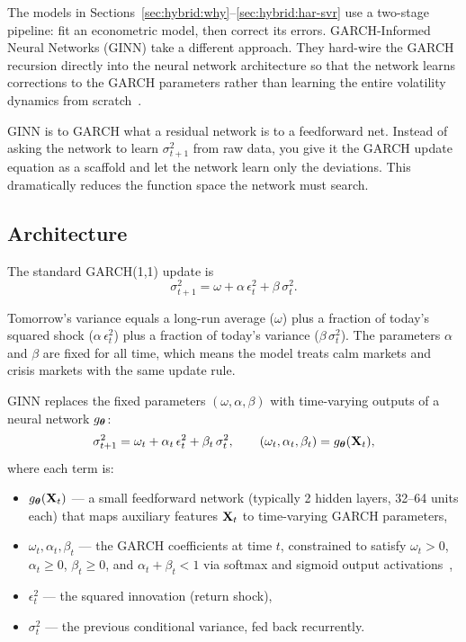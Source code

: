 The models in Sections~\ref{sec:hybrid:why}--\ref{sec:hybrid:har-svr} use
a two-stage pipeline: fit an econometric model, then correct its errors.
GARCH-Informed Neural Networks (GINN) take a different approach.
They hard-wire the GARCH recursion directly into the neural network
architecture so that the network learns corrections to the GARCH
parameters rather than learning the entire volatility dynamics from
scratch~\citep{GINN2024}.

\begin{keyidea}[GINN = Residual Learning for GARCH]
GINN is to GARCH what a residual network is to a feedforward net.
Instead of asking the network to learn $\sigma^2_{t+1}$ from raw data,
you give it the GARCH update equation as a scaffold and let the network
learn only the deviations.  This dramatically reduces the function space
the network must search.
\end{keyidea}

\subsection{Architecture}

The standard GARCH(1,1) update is
\begin{equation}\label{eq:garch-update}
  \sigma^2_{t+1} = \omega + \alpha\,\epsilon_t^2 + \beta\,\sigma^2_t.
\end{equation}

\begin{intuition}
Tomorrow's variance equals a long-run average ($\omega$) plus a fraction
of today's squared shock ($\alpha\,\epsilon_t^2$) plus a fraction of
today's variance ($\beta\,\sigma^2_t$).  The parameters $\alpha$ and
$\beta$ are fixed for all time, which means the model treats calm
markets and crisis markets with the same update rule.
\end{intuition}

GINN replaces the fixed parameters $(\omega, \alpha, \beta)$ with
time-varying outputs of a neural network $g_{\bm{\theta}}$:
\begin{equation}\label{eq:ginn}
  \sigma^2_{t+1} = \omega_t + \alpha_t\,\epsilon_t^2
    + \beta_t\,\sigma^2_t,
  \qquad
  (\omega_t, \alpha_t, \beta_t) = g_{\bm{\theta}}(\mathbf{X}_t),
\end{equation}
where each term is:
\begin{itemize}
  \item $g_{\bm{\theta}}(\mathbf{X}_t)$ --- a small feedforward network (typically 2
        hidden layers, 32--64 units each) that maps auxiliary features
        $\mathbf{X}_t$ to time-varying GARCH parameters,
  \item $\omega_t, \alpha_t, \beta_t$ --- the GARCH coefficients at time
        $t$, constrained to satisfy $\omega_t > 0$, $\alpha_t \geq 0$,
        $\beta_t \geq 0$, and $\alpha_t + \beta_t < 1$ via softmax and
        sigmoid output activations~\citep{GINN2024},
  \item $\epsilon_t^2$ --- the squared innovation (return shock),
  \item $\sigma^2_t$ --- the previous conditional variance, fed back
        recurrently.
\end{itemize}

